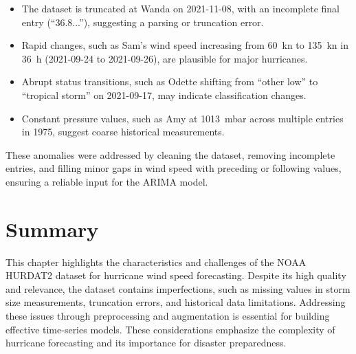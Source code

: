 \begin{itemize}
	\item The dataset is truncated at Wanda on 2021-11-08, with an incomplete final entry (``36.8...''), suggesting a parsing or truncation error.
	\item Rapid changes, such as Sam’s wind speed increasing from \SI{60}{\knot} to \SI{135}{\knot} in \SI{36}{\hour} (2021-09-24 to 2021-09-26), are plausible for major hurricanes.
	\item Abrupt status transitions, such as Odette shifting from ``other low'' to ``tropical storm'' on 2021-09-17, may indicate classification changes.
	\item Constant pressure values, such as Amy at \SI{1013}{\milli\bar} across multiple entries in 1975, suggest coarse historical measurements.
\end{itemize}

These anomalies were addressed by cleaning the dataset, removing incomplete entries, and filling minor gaps in wind speed with preceding or following values, ensuring a reliable input for the ARIMA model.

\section{Summary}
This chapter highlights the characteristics and challenges of the NOAA HURDAT2 dataset for hurricane wind speed forecasting. Despite its high quality and relevance, the dataset contains imperfections, such as missing values in storm size measurements, truncation errors, and historical data limitations. Addressing these issues through preprocessing and augmentation is essential for building effective time-series models. These considerations emphasize the complexity of hurricane forecasting and its importance for disaster preparedness.